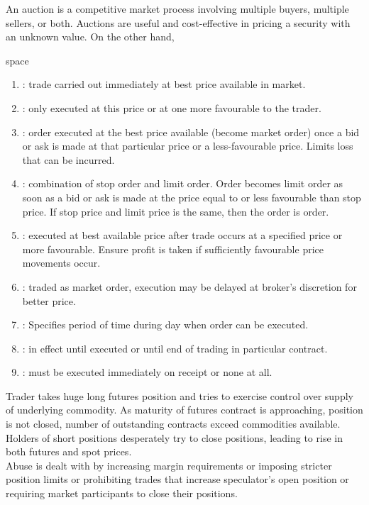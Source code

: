 An auction is a competitive market process involving multiple buyers, multiple sellers, or both. Auctions are useful and cost-effective in pricing a security with an unknown value. On the other hand, 

\begin{definition} {\color{white}space}
\begin{enumerate}[label=\roman*.]
\setlength{\itemsep}{0pt}
\item {}: trade carried out immediately at best price available in market.
\item {}: only executed at this price or at one more favourable to the trader.
\item {}: order executed at the best price available (become market order) once a bid or ask is made at that particular price or a less-favourable price. Limits loss that can be incurred.
\item {}: combination of stop order and limit order. Order becomes limit order as soon as a bid or ask is made at the price equal to or less favourable than stop price. If stop price and limit price is the same, then the order is  order.
\item {}: executed at best available price after trade occurs at a specified price or more favourable. Ensure profit is taken if sufficiently favourable price movements occur.
\item {}: traded as market order, execution may be delayed at broker's discretion for better price.
\item {}: Specifies period of time during day when order can be executed.
\item {}: in effect until executed or until end of trading in particular contract.
\item {}: must be executed immediately on receipt or none at all.
\end{enumerate}
\end{definition}

\begin{remark}
 Trader takes huge long futures position and tries to exercise control over supply of underlying commodity. As maturity of futures contract is approaching, position is not closed, number of outstanding contracts exceed commodities available. Holders of short positions desperately try to close positions, leading to rise in both futures and spot prices.\\
Abuse is dealt with by increasing margin requirements or imposing stricter position limits or prohibiting trades that increase speculator's open position or requiring market participants to close their positions.
\end{remark}

